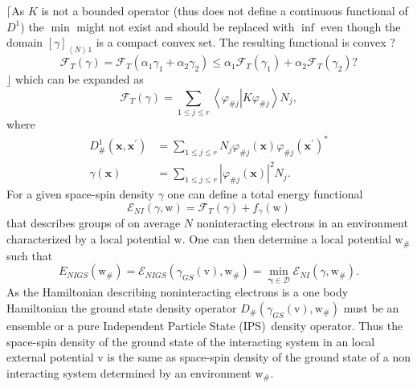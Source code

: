 \documentclass[aps,preprint]{revtex4}%
\begin{document}
$\lceil$As $K$ is not a bounded operator (thus does not define a continuous
functional of $D^{1}$) the $\min$ might not exist and should be replaced with
$\inf$ even though the domain $\left[  \gamma\right]  _{\left\langle
N\right\rangle 1}$ is a compact convex set. The resulting functional is convex
?
\begin{equation}
\mathcal{F}_{T}\left(  \gamma\right)  =\mathcal{F}_{T}\left(  \alpha_{1}%
\gamma_{1}+\alpha_{2}\gamma_{2}\right)  \leq\alpha_{1}\mathcal{F}_{T}\left(
\gamma_{1}\right)  +\alpha_{2}\mathcal{F}_{T}\left(  \gamma_{2}\right)  ?
\end{equation}
$\rfloor$ which can be expanded as
\begin{equation}
\mathcal{F}_{T}\left(  \gamma\right)  =\sum_{1\leq j\leq r}\left\langle
\varphi_{\#j}\left\vert K\varphi_{\#j}\right.  \right\rangle N_{j},
\end{equation}
where
\begin{align}
D_{\#}^{1}\left(  \mathbf{x,x}^{\prime}\right)   &  =\sum_{1\leq j\leq r}%
N_{j}\varphi_{\#j}\left(  \mathbf{x}\right)  \varphi_{\#j}\left(
\mathbf{x}^{\prime}\right)  ^{\ast}\nonumber\\
\gamma\left(  \mathbf{x}\right)   &  =\sum_{1\leq j\leq r}\left\vert
\varphi_{\#j}\left(  \mathbf{x}\right)  \right\vert ^{2}N_{j}. \label{gammaKS}%
\end{align}
For a given space-spin density $\gamma$ one can define a total energy
functional
\begin{equation}
\mathcal{E}_{NI}\left(  \gamma\mathbf{,}\mathrm{w}\right)  =\mathcal{F}%
_{T}\left(  \gamma\right)  +f_{\gamma}\left(  \mathrm{w}\right)
\end{equation}
that describes groups of on average $N$ noninteracting electrons in an
environment characterized by a local potential $\mathrm{w.}$ One can then
determine a local potential $\mathrm{w}_{\#}$ such that
\begin{equation}
E_{NIGS}\left(  \mathrm{w}_{\#}\right)  =\mathcal{E}_{NIGS}\left(  \gamma
_{GS}\left(  \mathrm{v}\right)  \mathbf{,}\mathrm{w}_{\#}\right)
=\min_{\mathbf{\gamma\in}\mathcal{D}}\mathcal{E}_{NI}\left(  \gamma
\mathbf{,}\mathrm{w}_{\#}\right)  .
\end{equation}
As the Hamiltonian describing noninteracting electrons is a one body
Hamiltonian the ground state density operator $D_{\#}\left(  \gamma
_{GS}\left(  \mathrm{v}\right)  \mathbf{,}\mathrm{w}_{\#}\right)  $ must be an
ensemble or a pure Independent Particle State (IPS)\ density operator. Thus
the space-spin density of the ground state of the interacting system in an
local external potential $\mathrm{v}$ is the same as space-spin density of the
ground state of a non interacting system determined by an environment
$\mathrm{w}_{\#}\mathrm{.}$
\end{document}
